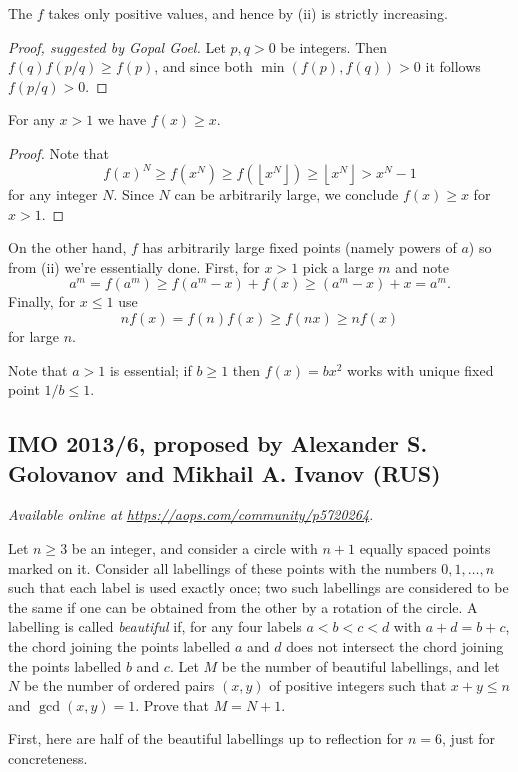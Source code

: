 \documentclass[11pt]{scrartcl}
\begin{document}
\begin{claim*}
  The $f$ takes only positive values,
  and hence by (ii) is strictly increasing.
\end{claim*}
\begin{proof}[Proof, suggested by Gopal Goel]
  Let $p,q > 0$ be integers.
  Then $f(q) f(p/q) \ge f(p)$,
  and since both $\min(f(p), f(q)) > 0$
  it follows $f(p/q) > 0$.
\end{proof}

\begin{claim*}
  For any $x > 1$ we have $f(x) \ge x$.
\end{claim*}
\begin{proof}
  Note that
  \[ f(x)^N \ge f(x^N) \ge f\left( \left\lfloor x^N \right\rfloor \right)
    \ge \left\lfloor x^N \right\rfloor > x^N-1 \]
  for any integer $N$.
  Since $N$ can be arbitrarily large,
  we conclude $f(x) \ge x$ for $x > 1$.
\end{proof}

On the other hand, $f$ has arbitrarily large fixed points
(namely powers of $a$) so from (ii) we're essentially done.
First, for $x > 1$ pick a large $m$ and note
\[ a^m = f(a^m) \ge f(a^m-x) + f(x) \ge (a^m-x)+x = a^m. \]
Finally, for $x \le 1$ use
\[ nf(x) = f(n)f(x) \ge f(nx) \ge nf(x) \]
for large $n$.

\begin{remark*}
Note that $a > 1$ is essential;
if $b \ge 1$ then $f(x) = bx^2$ works with unique fixed point $1/b \le 1$.
\end{remark*}
\pagebreak

\subsection{IMO 2013/6, proposed by Alexander S. Golovanov and Mikhail A. Ivanov (RUS)}
\textsl{Available online at \url{https://aops.com/community/p5720264}.}
\begin{mdframed}[style=mdpurplebox,frametitle={Problem statement}]
Let $n \ge 3$ be an integer, and consider a circle with $n + 1$ equally spaced points marked on it.
Consider all labellings of these points with the numbers
$0, 1, \dots , n$ such that each label is used exactly once;
two such labellings are considered to be the same if
one can be obtained from the other by a rotation of the circle.
A labelling is called \emph{beautiful} if, for any four labels $a < b < c < d$ with $a + d = b + c$,
the chord joining the points labelled $a$ and $d$
does not intersect the chord joining the points labelled $b$ and $c$.
Let $M$ be the number of beautiful labellings,
and let $N$ be the number of ordered pairs $(x, y)$ of positive integers
such that $x + y \le n$ and $\gcd(x, y) = 1$.
Prove that $M = N + 1$.
\end{mdframed}
First, here are half of the beautiful labellings up to reflection for $n = 6$,
just for concreteness.
\end{document}
